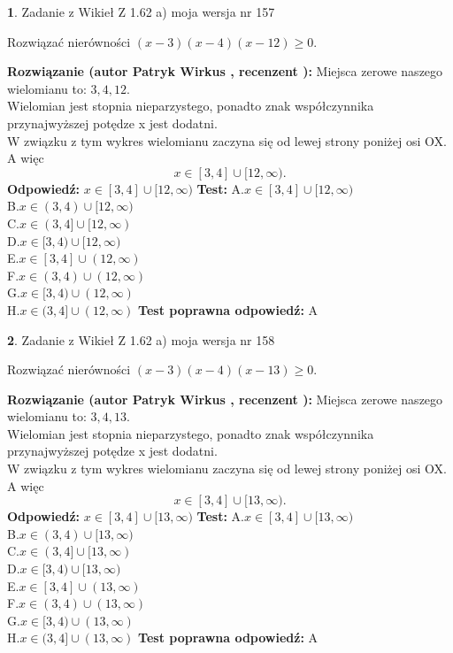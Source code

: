\documentclass[12pt, a4paper]{article}
\theoremstyle{definition} %
\newtheorem{zad}{}
\newcommand{\zadStart}[1]{\begin{zad}#1\newline}
\newcommand{\zadStop}{\end{zad}}
\newcommand{\rozwStart}[2]{\noindent \textbf{Rozwiązanie (autor #1 , recenzent #2): }\newline}
\newcommand{\rozwStop}{\newline}
\newcommand{\odpStart}{\noindent \textbf{Odpowiedź:}\newline}
\newcommand{\odpStop}{\newline}
\newcommand{\testStart}{\noindent \textbf{Test:}\newline}
\newcommand{\testStop}{\newline}
\newcommand{\kluczStart}{\noindent \textbf{Test poprawna odpowiedź:}\newline}
\newcommand{\kluczStop}{\newline}
\begin{document}
\zadStart{Zadanie z Wikieł Z 1.62 a) moja wersja nr 157}

Rozwiązać nierówności $(x-3)(x-4)(x-12)\ge0$.
\zadStop
\rozwStart{Patryk Wirkus}{}
Miejsca zerowe naszego wielomianu to: $3, 4, 12$.\\
Wielomian jest stopnia nieparzystego, ponadto znak współczynnika przy\linebreak najwyższej potędze x jest dodatni.\\ W związku z tym wykres wielomianu zaczyna się od lewej strony poniżej osi OX. A więc $$x \in [3,4] \cup [12,\infty).$$
\rozwStop
\odpStart
$x \in [3,4] \cup [12,\infty)$
\odpStop
\testStart
A.$x \in [3,4] \cup [12,\infty)$\\
B.$x \in (3,4) \cup [12,\infty)$\\
C.$x \in (3,4] \cup [12,\infty)$\\
D.$x \in [3,4) \cup [12,\infty)$\\
E.$x \in [3,4] \cup (12,\infty)$\\
F.$x \in (3,4) \cup (12,\infty)$\\
G.$x \in [3,4) \cup (12,\infty)$\\
H.$x \in (3,4] \cup (12,\infty)$
\testStop
\kluczStart
A
\kluczStop



\zadStart{Zadanie z Wikieł Z 1.62 a) moja wersja nr 158}

Rozwiązać nierówności $(x-3)(x-4)(x-13)\ge0$.
\zadStop
\rozwStart{Patryk Wirkus}{}
Miejsca zerowe naszego wielomianu to: $3, 4, 13$.\\
Wielomian jest stopnia nieparzystego, ponadto znak współczynnika przy\linebreak najwyższej potędze x jest dodatni.\\ W związku z tym wykres wielomianu zaczyna się od lewej strony poniżej osi OX. A więc $$x \in [3,4] \cup [13,\infty).$$
\rozwStop
\odpStart
$x \in [3,4] \cup [13,\infty)$
\odpStop
\testStart
A.$x \in [3,4] \cup [13,\infty)$\\
B.$x \in (3,4) \cup [13,\infty)$\\
C.$x \in (3,4] \cup [13,\infty)$\\
D.$x \in [3,4) \cup [13,\infty)$\\
E.$x \in [3,4] \cup (13,\infty)$\\
F.$x \in (3,4) \cup (13,\infty)$\\
G.$x \in [3,4) \cup (13,\infty)$\\
H.$x \in (3,4] \cup (13,\infty)$
\testStop
\kluczStart
A
\kluczStop
\end{document}
